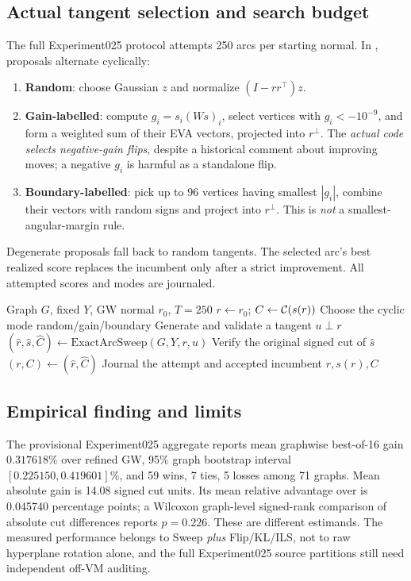 \subsection{Actual tangent selection and search budget}
The full Experiment025 protocol attempts 250 arcs per starting normal. In , proposals alternate cyclically:
\begin{enumerate}
\item \textbf{Random}: choose Gaussian $z$ and normalize $(I-rr^\top)z$.
\item \textbf{Gain-labelled}: compute $g_i=s_i(Ws)_i$, select vertices with $g_i<-10^{-9}$, and form a weighted sum of their EVA vectors, projected into $r^\perp$. The \emph{actual code selects negative-gain flips}, despite a historical comment about improving moves; a negative $g_i$ is harmful as a standalone flip.
\item \textbf{Boundary-labelled}: pick up to 96 vertices having smallest $|g_i|$, combine their vectors with random signs and project into $r^\perp$. This is \emph{not} a smallest-angular-margin rule.
\end{enumerate}
Degenerate proposals fall back to random tangents. The selected arc's best realized score replaces the incumbent only after a strict improvement. All attempted scores and modes are journaled.

\begin{algorithm}[tb]
\caption{Hyperplane Sweep: one matched GW start}\label{alg:hp}
\begin{algorithmic}[1]
\Require Graph $G$, fixed $Y$, GW normal $r_0$, $T=250$
\State $r\gets r_0$; $C\gets\mathcal{C}(s(r))$
 \State Choose the cyclic mode random/gain/boundary
 \State Generate and validate a tangent $u\perp r$
 \State $(\hat r,\hat s,\hat C)\gets\mathrm{ExactArcSweep}(G,Y,r,u)$
 \State Verify the original signed cut of $\hat s$
   \State $(r,C)\gets(\hat r,\hat C)$
 \EndIf
 \State Journal the attempt and accepted incumbent
\EndFor
\State \Return $r,s(r),C$
\end{algorithmic}
\end{algorithm}

\subsection{Empirical finding and limits}
The provisional Experiment025 aggregate reports mean graphwise best-of-16 gain $0.317618\%$ over refined GW, 95\% graph bootstrap interval $[0.225150,0.419601]\%$, and 59 wins, 7 ties, 5 losses among 71 graphs. Mean absolute gain is 14.08 signed cut units. Its mean relative advantage over  is 0.045740 percentage points; a Wilcoxon graph-level signed-rank comparison of absolute cut differences reports $p=0.226$. These are different estimands. The measured performance belongs to Sweep \emph{plus} Flip/KL/ILS, not to raw hyperplane rotation alone, and the full Experiment025 source partitions still need independent off-VM auditing.
